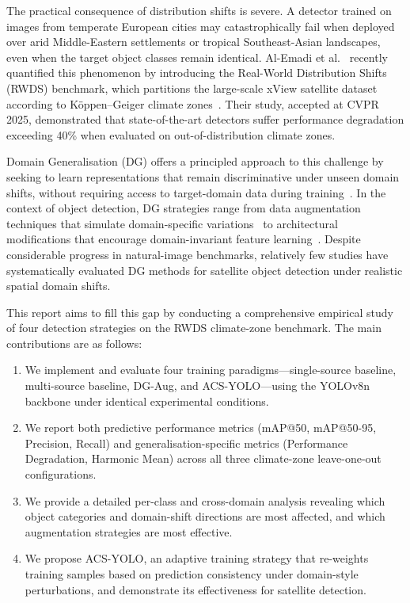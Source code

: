 \documentclass[12pt,a4paper]{article}
\begin{document}
The practical consequence of distribution shifts is severe. A detector trained on images from temperate European cities may catastrophically fail when deployed over arid Middle-Eastern settlements or tropical Southeast-Asian landscapes, even when the target object classes remain identical. Al-Emadi et al.~\cite{alemadi2025rwds} recently quantified this phenomenon by introducing the Real-World Distribution Shifts (RWDS) benchmark, which partitions the large-scale xView satellite dataset~\cite{shermeyer2020xview} according to K\"{o}ppen--Geiger climate zones~\cite{beck2018koppen}. Their study, accepted at CVPR 2025, demonstrated that state-of-the-art detectors suffer performance degradation exceeding 40\% when evaluated on out-of-distribution climate zones.

Domain Generalisation (DG) offers a principled approach to this challenge by seeking to learn representations that remain discriminative under unseen domain shifts, without requiring access to target-domain data during training~\cite{wang2022domainsurvey,zhou2022dg}. In the context of object detection, DG strategies range from data augmentation techniques that simulate domain-specific variations~\cite{volpi2018adversarial,xu2020adversarialaugment} to architectural modifications that encourage domain-invariant feature learning~\cite{li2018domaincondbn,pan2018batchinstance}. Despite considerable progress in natural-image benchmarks, relatively few studies have systematically evaluated DG methods for satellite object detection under realistic spatial domain shifts.

This report aims to fill this gap by conducting a comprehensive empirical study of four detection strategies on the RWDS climate-zone benchmark. The main contributions are as follows:

\begin{enumerate}[label=(\arabic*), leftmargin=*]
    \item We implement and evaluate four training paradigms---single-source baseline, multi-source baseline, DG-Aug, and ACS-YOLO---using the YOLOv8n backbone under identical experimental conditions.
    \item We report both predictive performance metrics (mAP@50, mAP@50-95, Precision, Recall) and generalisation-specific metrics (Performance Degradation, Harmonic Mean) across all three climate-zone leave-one-out configurations.
    \item We provide a detailed per-class and cross-domain analysis revealing which object categories and domain-shift directions are most affected, and which augmentation strategies are most effective.
    \item We propose ACS-YOLO, an adaptive training strategy that re-weights training samples based on prediction consistency under domain-style perturbations, and demonstrate its effectiveness for satellite detection.
\end{enumerate}
\end{document}
